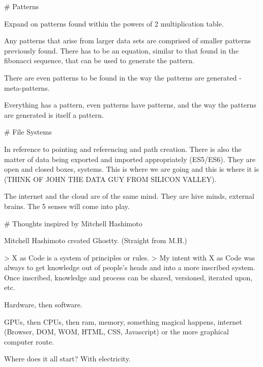# Patterns

Expand on patterns found within the powers of 2 multiplication table.

Any patterns that arise from larger data sets are comprised of smaller patterns previously found. There has to be an equation, similar to that found in the fibonacci sequence, that can be used to generate the pattern.

There are even patterns to be found in the way the patterns are generated - meta-patterns.

Everything has a pattern, even patterns have patterns, and the way the patterns are generated is itself a pattern.

# File Systems

In reference to pointing and referencing and path creation. There is also the matter of data being exported and imported appropriately (ES5/ES6). They are open and closed boxes, systems. This is where we are going and this is where it is (THINK OF JOHN THE DATA GUY FROM SILICON VALLEY).

The internet and the cloud are of the same mind. They are hive minds, external brains. The 5 senses will come into play. 

# Thoughts inspired by Mitchell Hashimoto

Mitchell Hashimoto created Ghostty. 
(Straight from M.H.) 

> X as Code is a system of principles or rules. 
> My intent with X as Code was always to get knowledge out of people's heads and into a more inscribed system. Once inscribed, knowledge and process can be shared, versioned, iterated upon, etc. 

Hardware, then software. 

GPUs, then CPUs, then ram, memory, something magical happens, internet (Browser, DOM, WOM, HTML, CSS, Javascript) or the more graphical computer route.

Where does it all start? With electricity. 